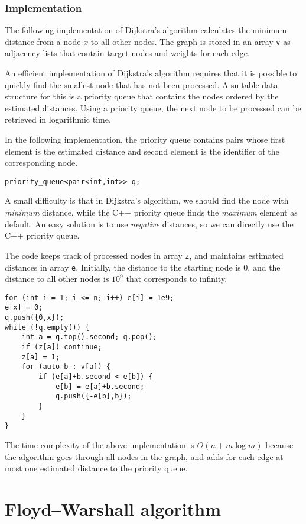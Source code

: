 \subsubsection{Implementation}

The following implementation of Dijkstra's algorithm
calculates the minimum distance from a node $x$
to all other nodes.
The graph is stored in an array \texttt{v}
as adjacency lists that contain target nodes
and weights for each edge.

An efficient implementation of Dijkstra's algorithm
requires that it is possible to quickly find the
smallest node that has not been processed.
A suitable data structure for this is a priority queue
that contains the nodes ordered by the estimated distances.
Using a priority queue, the next node to be processed
can be retrieved in logarithmic time.

In the following implementation,
the priority queue contains pairs whose first
element is the estimated distance and second
element is the identifier of the corresponding node.
\begin{lstlisting}
priority_queue<pair<int,int>> q;
\end{lstlisting}
A small difficulty is that in Dijkstra's algorithm,
we should find the node with \emph{minimum} distance,
while the C++ priority queue finds the \emph{maximum}
element as default.
An easy solution is to use \emph{negative} distances,
so we can directly use the C++ priority queue.

The code keeps track of processed nodes
in array \texttt{z},
and maintains estimated distances in array \texttt{e}.
Initially, the distance to the starting node is 0,
and the distance to all other nodes is $10^9$
that corresponds to infinity.

\begin{lstlisting}
for (int i = 1; i <= n; i++) e[i] = 1e9;
e[x] = 0;
q.push({0,x});
while (!q.empty()) {
    int a = q.top().second; q.pop();
    if (z[a]) continue;
    z[a] = 1;
    for (auto b : v[a]) {
        if (e[a]+b.second < e[b]) {
            e[b] = e[a]+b.second;
            q.push({-e[b],b});
        }
    }
}
\end{lstlisting}

The time complexity of the above implementation is
$O(n+m \log m)$ because the algorithm goes through
all nodes in the graph, and adds for each edge
at most one estimated distance to the priority queue.

\section{Floyd–Warshall algorithm}

